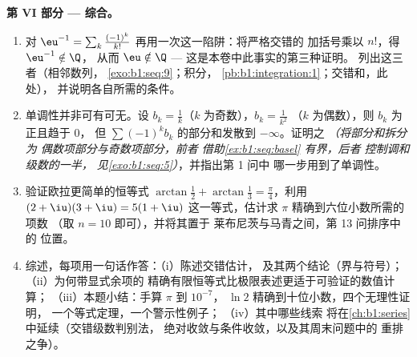 \begin{problem}
\medskip
\noindent\textbf{第 VI 部分 --- 综合。}
\begin{enumerate}[resume]
  \item 对 $\eu^{-1} = \sum_k
        \frac{(-1)^k}{k!}$ 再用一次这一陷阱：将严格交错的
        加括号乘以 $n!$，得 $\eu^{-1} \notin \Q$，
        从而 $\eu \notin \Q$ --- 这是本卷中此事实的第三种证明。
        列出这三者（相邻数列，
        \cref{exo:b1:seq:9}；积分，
        \cref{pb:b1:integration:1}；交错和，此处），
        并说明各自所需的条件。
  \item 单调性并非可有可无。设
        $b_k = \frac1k$（$k$ 为奇数），$b_k = \frac{1}{k^2}$
        （$k$ 为偶数），则 $b_k$ 为正且趋于 $0$，
        但 $\sum (-1)^k b_k$ 的部分和发散到
        $-\infty$。证明之 \emph{（将部分和拆分为
        偶数项部分与奇数项部分，前者
        借助\cref{ex:b1:seq:basel} 有界，后者
        控制调和级数的一半，
        见\cref{exo:b1:seq:5}）}，并指出第 1 问中
        哪一步用到了单调性。
  \item 验证欧拉更简单的恒等式 $\arctan\frac12 +
        \arctan\frac13 = \frac\pi4$，利用 $(2 + \iu)(3 + \iu) =
        5(1 + \iu)$ 这一等式，估计求 $\pi$ 精确到六位小数所需的项数
        （取 $n = 10$ 即可），并将其置于
        莱布尼茨与马青之间，第 13 问排序中的
        位置。
  \item 综述，每项用一句话作答：（i）陈述交错估计，
        及其两个结论（界与符号）；（ii）为何带显式余项的
        精确有限恒等式比极限表述更适于可验证的数值计算；
        （iii）本题小结：手算 $\pi$ 到 $10^{-7}$，
        $\ln 2$ 精确到十位小数，四个无理性证明，
        一个等式定理，一个警示性例子；
        （iv）其中哪些线索
        将在\cref{ch:b1:series}中延续（交错级数判别法，
        绝对收敛与条件收敛，以及其周末问题中的
        重排之争）。
\end{enumerate}
\end{problem}
